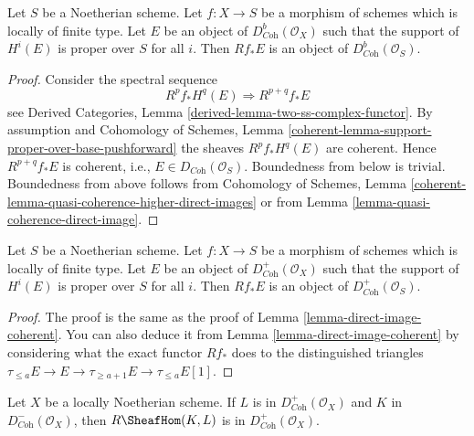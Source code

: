 \begin{lemma}
\label{lemma-direct-image-coherent}
Let $S$ be a Noetherian scheme. Let $f : X \to S$ be a morphism of schemes
which is locally of finite type. Let $E$ be an object of
$D^b_{\textit{Coh}}(\mathcal{O}_X)$ such that the support of $H^i(E)$
is proper over $S$ for all $i$.
Then $Rf_*E$ is an object of $D^b_{\textit{Coh}}(\mathcal{O}_S)$.
\end{lemma}

\begin{proof}
Consider the spectral sequence
$$
R^pf_*H^q(E) \Rightarrow R^{p + q}f_*E
$$
see Derived Categories, Lemma \ref{derived-lemma-two-ss-complex-functor}.
By assumption and
Cohomology of Schemes, Lemma
\ref{coherent-lemma-support-proper-over-base-pushforward}
the sheaves $R^pf_*H^q(E)$ are coherent. Hence
$R^{p + q}f_*E$ is coherent, i.e., $E \in D_{\textit{Coh}}(\mathcal{O}_S)$.
Boundedness from below is trivial. Boundedness from above
follows from
Cohomology of Schemes, Lemma
\ref{coherent-lemma-quasi-coherence-higher-direct-images}
or from
Lemma \ref{lemma-quasi-coherence-direct-image}.
\end{proof}

\begin{lemma}
\label{lemma-direct-image-coherent-bdd-below}
Let $S$ be a Noetherian scheme. Let $f : X \to S$ be a morphism of schemes
which is locally of finite type. Let $E$ be an object of
$D^+_{\textit{Coh}}(\mathcal{O}_X)$ such that the support of $H^i(E)$
is proper over $S$ for all $i$.
Then $Rf_*E$ is an object of $D^+_{\textit{Coh}}(\mathcal{O}_S)$.
\end{lemma}

\begin{proof}
The proof is the same as the proof of
Lemma \ref{lemma-direct-image-coherent}.
You can also deduce it from
Lemma \ref{lemma-direct-image-coherent}
by considering what the exact functor $Rf_*$ does to
the distinguished triangles
$\tau_{\leq a}E \to E \to \tau_{\geq a + 1}E \to \tau_{\leq a}E[1]$.
\end{proof}

\begin{lemma}
\label{lemma-coherent-internal-hom}
Let $X$ be a locally Noetherian scheme. If $L$ is in
$D^+_{\textit{Coh}}(\mathcal{O}_X)$ and $K$ in
$D^-_{\textit{Coh}}(\mathcal{O}_X)$, then
$R\SheafHom(K, L)$ is in $D^+_{\textit{Coh}}(\mathcal{O}_X)$.
\end{lemma}

